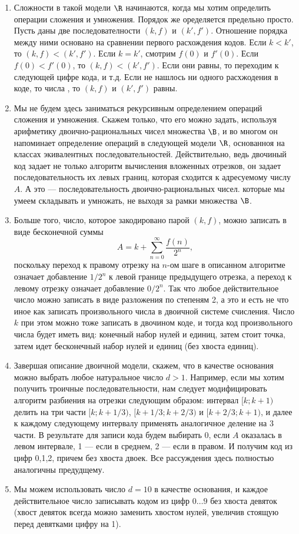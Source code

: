 \begin{enumerate}
\item Сложности в такой модели $\R$ начинаются, когда мы хотим определить операции сложения и умножения. Порядок же оределяется предельно просто. Пусть даны две последователности $(k,f)$ и $(k',f')$. Отношение порядка между ними основано на сравнении первого расхождения кодов. Если $k<k'$, то $(k,f)<(k',f')$. Если $k=k'$, смотрим $f(0)$ и $f'(0)$. Если $f(0)<f'(0)$, то $(k,f)<(k',f')$. Если они равны, то переходим к следующей цифре кода, и т.д. Если не нашлось ни одного расхжодения в коде, то числа , то $(k,f)$ и $(k',f')$ равны.
\item Мы не будем здесь заниматься рекурсивным определением операций сложения и умножения. Скажем только, что его можно задать, используя арифметику двоично-рациональных чисел множества $\B$, и во многом он напоминает определение операций в следующей модели $\R$, основанноя на классах экивалентных последовательностей. Действительно, ведь двочиный код задает не только алгоритм вычисления вложенных отрезков, он задает последовательность их левых границ, которая сходится к адресуемому числу $A$. А это --- последовательность двоично-рациональных чисел. которые мы умеем складывать и умножать, не выходя за рамки множества $\B$.
\item Больше того, число, которое закодировано парой $(k,f)$, можно записать в виде бесконечной суммы
$$
A = k+\sum_{n=0}^\infty\frac{f(n)}{2^n},
$$
поскольку переход к правому отрезку на $n$-ом шаге в описанном алгоритме означает добавление $1/2^n$ к левой границе предыдущего отрезка, а переход к левому отрезку означает добавление $0/2^n$. Так что любое действительное число можно записать в виде разложения по степеням 2, а это и есть не что иное как записать произвольного числа в двоичной системе счисления. Число $k$ при этом можно тоже записать в двочином коде, и тогда код произвольного числа будет иметь вид: конечный набор нулей и единиц, затем стоит точка, затем идет бесконечный набор нулей и единиц (без хвоста единиц).
\item Завершая описание двоичной модели, скажем, что в качестве основания можно выбрать любое натуральное число $d>1$. Например, если мы хотим получить троичные последовательности, нам следует модифицировать алгоритм разбиения на отрезки следующим образом: интервал $[k;k+1)$ делить на три части $[k;k+1/3)$, $[k+1/3;k+2/3)$ и $[k+2/3;k+1)$, и далее к каждому следующему интервалу применять аналогичное деление на 3 части. В результате для записи кода будем выбирать 0, если $A$ оказалась в левом интервале, 1 --- если в среднем, 2 --- если в правом. И получим код из цифр 0,1,2, причем без хвоста двоек. Все рассуждения здесь полностью аналогичны предудщему.
\item Мы можем использовать число $d=10$ в качестве основания, и каждое действительное число записывать кодом из цифр $0\dots 9$ без хвоста девяток (хвост девяток всегда можно заменить хвостом нулей, увеличив стоящую перед девятками цифру на 1).



\end{enumerate}
